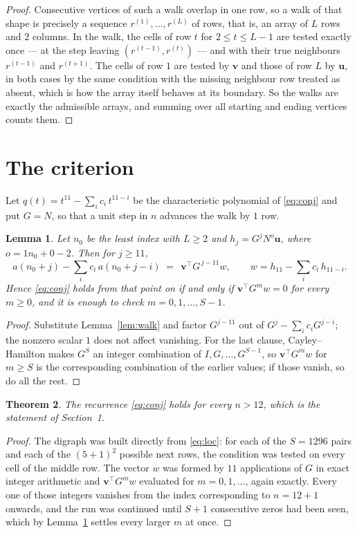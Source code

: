\documentclass[11pt,a4paper]{article}
\theoremstyle{plain}
\newtheorem{theorem}{Theorem}
\newtheorem{lemma}[theorem]{Lemma}
\theoremstyle{definition}
\begin{document}
\begin{proof}
Consecutive vertices of such a walk overlap in one row, so a walk of that shape is
precisely a sequence $r^{(1)},\dots,r^{(L)}$ of rows, that is, an array of $L$ rows
and $2$ columns. In the walk, the cells of row $t$ for $2\le t\le L-1$ are tested
exactly once --- at the step leaving $(r^{(t-1)},r^{(t)})$ --- and with their true
neighbours $r^{(t-1)}$ and $r^{(t+1)}$. The cells of row $1$ are tested by
$\mathbf{v}$ and those of row $L$ by $\mathbf{u}$, in both cases by the same condition
with the missing neighbour row treated as absent, which is how the array itself behaves at
its boundary. So the walks are exactly the admissible arrays, and summing over all starting
and ending vertices counts them.
\end{proof}

\section{The criterion}

Let $q(t)=t^{11}-\sum_i c_i\,t^{11-i}$ be the characteristic polynomial of
\eqref{eq:conj} and put $G=N$, so that a unit step in $n$ advances the walk by
$1$ row.

\begin{lemma}\label{lem:crit}
Let $n_0$ be the least index with $L\ge2$ and $h_j=G^{j}N^{o}\mathbf{u}$, where
$o=1n_0+0-2$. Then for $j\ge11$,
\[
a(n_0+j)-\sum_i c_i\,a(n_0+j-i)\;=\;\,\mathbf{v}^{\!\top}G^{\,j-11}w,
\qquad w=h_{11}-\sum_i c_i\,h_{11-i} .
\]
Hence \eqref{eq:conj} holds from that point on if and only if
$\mathbf{v}^{\!\top}G^{m}w=0$ for every $m\ge0$, and it is enough to check
$m=0,1,\dots,S-1$.
\end{lemma}

\begin{proof}
Substitute Lemma~\ref{lem:walk} and factor $G^{j-11}$ out of
$G^{j}-\sum_ic_iG^{j-i}$; the nonzero scalar $1$ does not affect
vanishing. For the last clause, Cayley--Hamilton makes $G^{S}$ an integer combination of
$I,G,\dots,G^{S-1}$, so $\mathbf{v}^{\!\top}G^{m}w$ for $m\ge S$ is the corresponding
combination of the earlier values; if those vanish, so do all the rest.
\end{proof}

\begin{theorem}
The recurrence \eqref{eq:conj} holds for every $n>12$, which is the statement of
Section~1.
\end{theorem}

\begin{proof}
The digraph was built directly from \eqref{eq:loc}: for each of the $S=1296$ pairs and each
of the $(5+1)^{2}$ possible next rows, the condition was tested on every cell of
the middle row. The vector $w$ was formed by $11$ applications of $G$ in exact integer
arithmetic and $\mathbf{v}^{\!\top}G^{m}w$ evaluated for $m=0,1,\dots$, again exactly.
Every one of those integers vanishes from the index corresponding to $n=12+1$ onwards,
and the run was continued until $S+1$ consecutive zeros had been seen, which by
Lemma~\ref{lem:crit} settles every larger $m$ at once.
\end{proof}
\end{document}

